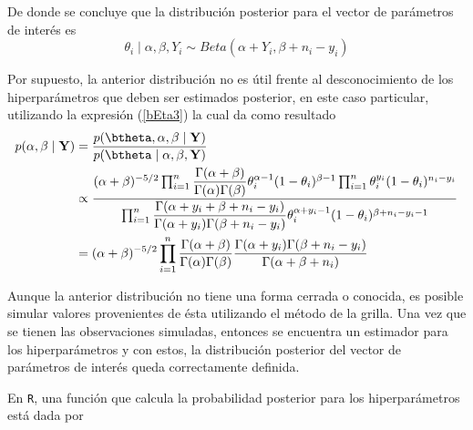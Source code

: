 De donde se concluye que la distribución posterior para el vector de parámetros de interés es
\begin{equation*}
\theta_i \mid \alpha,\beta,Y_i \sim Beta(\alpha+Y_i, \beta+n_i-y_i)
\end{equation*}

Por supuesto, la anterior distribución no es útil frente al desconocimiento de los hiperparámetros que deben ser estimados posterior, en este caso particular, utilizando la expresión (\ref{bEta3}) la cual da como resultado
\begin{align*}
p(\alpha,\beta \mid \mathbf{Y})
&=\frac{p(\btheta, \alpha,\beta \mid \mathbf{Y})}{p(\btheta \mid \alpha,\beta,\mathbf{Y})}\\
&\propto
\frac{(\alpha+\beta)^{-5/2}\prod_{i=1}^n \dfrac{\Gamma(\alpha+\beta)}{\Gamma(\alpha)\Gamma(\beta)}
\theta_i^{\alpha-1}(1-\theta_i)^{\beta-1}\prod_{i=1}^n \theta_i^{y_i}(1-\theta_i)^{n_i-y_i}}
{\prod_{i=1}^n \dfrac{\Gamma(\alpha+y_i+\beta+n_i-y_i)}{\Gamma(\alpha+y_i)\Gamma(\beta+n_i-y_i)}
\theta_i^{\alpha+y_i-1}(1-\theta_i)^{\beta+n_i-y_i-1}}\\
&=(\alpha+\beta)^{-5/2}
\prod_{i=1}^n \frac{\Gamma(\alpha+\beta)}{\Gamma(\alpha)\Gamma(\beta)}
\frac{\Gamma(\alpha+y_i)\Gamma(\beta+n_i-y_i)}{\Gamma(\alpha+\beta+n_i)}
\end{align*}

Aunque la anterior distribución no tiene una forma cerrada o conocida, es posible simular valores provenientes de ésta utilizando el método de la grilla. Una vez que se tienen las observaciones simuladas, entonces se encuentra un estimador para los hiperparámetros y con estos, la distribución posterior del vector de parámetros de interés queda correctamente definida.

En \verb'R', una función que calcula la probabilidad posterior para los hiperparámetros está dada por
\begin{knitrout}
\color{fgcolor}\begin{kframe}
\begin{alltt}
\hlkwb{<-}\hlstd{(}\hlstd{,}\hlstd{,}\hlstd{,}\hlstd{)\{}
   \hlkwb{<-} \hlopt{+}
   \hlkwb{<-} \hlopt{*}
   \hlkwb{<-} \hlopt{+}\hlopt{*}\hlopt{+}\hlopt{-}
   \hlkwb{<-} \hlopt{+}\hlopt{+}
   \hlopt{+}\hlopt{^}\hlstd{(}\hlopt{-}\hlopt{/}\hlstd{)}\hlopt{*}\hlopt{/}\hlopt{*}\hlopt{/}
 \hlstd{\}}
\end{alltt}
\end{kframe}
\end{knitrout}


